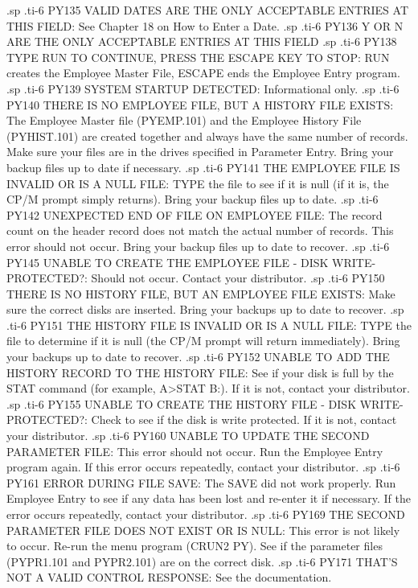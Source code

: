 .sp
.ti-6
PY135 VALID DATES ARE THE ONLY ACCEPTABLE ENTRIES AT THIS FIELD:  See Chapter
18 on How to Enter a Date.
.sp
.ti-6
PY136 Y  OR  N	ARE THE ONLY ACCEPTABLE ENTRIES AT THIS FIELD
.sp
.ti-6
PY138 TYPE  RUN  TO CONTINUE, PRESS THE ESCAPE KEY TO STOP: RUN creates
the Employee Master File, ESCAPE ends the Employee Entry program.
.sp
.ti-6
PY139 SYSTEM STARTUP DETECTED: Informational only.
.sp
.ti-6
PY140 THERE IS NO EMPLOYEE FILE, BUT A HISTORY FILE EXISTS:  The Employee
Master file (PYEMP.101) and the Employee History File (PYHIST.101) are created
together and always have the same number of records.  Make sure your
files are in the drives specified in Parameter Entry.  Bring your backup
files up to date if necessary.
.sp
.ti-6
PY141 THE EMPLOYEE FILE IS INVALID OR IS A NULL FILE: TYPE the file
to see if it is null (if it is, the CP/M prompt simply returns).  Bring
your backup files up to date.
.sp
.ti-6
PY142 UNEXPECTED END OF FILE ON EMPLOYEE FILE: The record count on the
header record does not match the actual number of records.  This error
should not occur.  Bring your backup files up to date to recover.
.sp
.ti-6
PY145 UNABLE TO CREATE THE EMPLOYEE FILE - DISK WRITE-PROTECTED?: Should
not occur.  Contact your distributor.
.sp
.ti-6
PY150 THERE IS NO HISTORY FILE, BUT AN EMPLOYEE FILE EXISTS: Make sure the
correct disks are inserted.  Bring your backups up to date to recover.
.sp
.ti-6
PY151 THE HISTORY FILE IS INVALID OR IS A NULL FILE: TYPE the file to
determine if it is null (the CP/M prompt will return immediately).  Bring your
backups up to date to recover.
.sp
.ti-6
PY152 UNABLE TO ADD THE HISTORY RECORD TO THE HISTORY FILE: See
if your disk is full by the STAT command (for example, A>STAT B:).  If it is
not, contact your distributor.
.sp
.ti-6
PY155 UNABLE TO CREATE THE HISTORY FILE - DISK WRITE-PROTECTED?: Check to
see if the disk is write protected.  If it is not, contact your distributor.
.sp
.ti-6
PY160 UNABLE TO UPDATE THE SECOND PARAMETER FILE: This error should not
occur.	Run the Employee Entry program again.  If this error occurs repeatedly,
contact your distributor.
.sp
.ti-6
PY161 ERROR DURING FILE SAVE: The SAVE did not work properly.  Run Employee
Entry to see if any data has been lost and re-enter it if necessary.  If the
error occurs repeatedly, contact your distributor.
.sp
.ti-6
PY169 THE SECOND PARAMETER FILE DOES NOT EXIST OR IS NULL: This error is
not likely to occur.  Re-run the menu program (CRUN2 PY).  See if
the parameter files (PYPR1.101 and PYPR2.101) are on the correct disk.
.sp
.ti-6
PY171 THAT'S NOT A VALID CONTROL RESPONSE: See the documentation.

